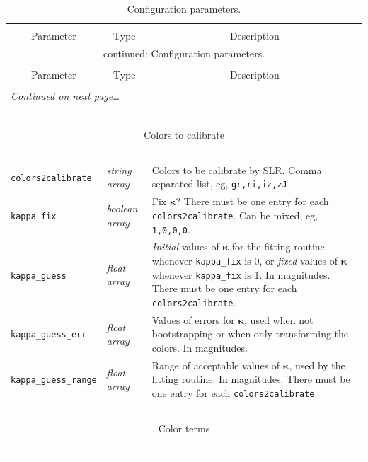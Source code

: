 \documentclass{report}
\newcommand{\zptcolor}{\boldsymbol{\kappa}}
\begin{document}
\begin{center}
\begin{longtable}{llp{3.5in}}
\caption[Configuration parameters.]{Configuration parameters.}
\label{tab:config} \\
  \hline \hline \\[-2ex]
  \multicolumn{1}{c}{Parameter} &
  \multicolumn{1}{c}{Type} &
  \multicolumn{1}{c}{Description} \\[0.5ex] \hline
\endfirsthead
\multicolumn{3}{c}{{\tablename} \thetable{} continued: Configuration parameters.} \\[0.5ex]
  \hline \hline \\[-2ex]
  \multicolumn{1}{c}{Parameter} &
  \multicolumn{1}{c}{Type} &
  \multicolumn{1}{c}{Description} 
\\[0.5ex] \hline
  \\[-1.8ex]
\endhead
\multicolumn{3}{l}{{{\it Continued on next page}\ldots}} \\
\endfoot
  \\[-1.8ex] \hline \hline
\endlastfoot

~ & ~ & ~ \\ \hline
\multicolumn{3}{c}{Colors to calibrate} \\
\hline ~ & ~ & ~ \\ 

\verb|colors2calibrate| & {\it string array} & Colors to be calibrate by SLR. Comma separated list, eg, \verb|gr,ri,iz,zJ| \\
\verb|kappa_fix| & {\it boolean array} & Fix $\zptcolor$? There must be one entry for each \verb|colors2calibrate|. Can be mixed, eg, \verb|1,0,0,0|. \\
\verb|kappa_guess| & {\it float array} & {\it Initial} values of $\zptcolor$ for the fitting routine whenever \verb|kappa_fix| is 0, or {\it fixed} values of $\mathbf{\kappa}$ whenever \verb|kappa_fix| is 1. In magnitudes. There must be one entry for each \verb|colors2calibrate|. \\
\verb|kappa_guess_err| & {\it float array} & Values of errors for $\zptcolor$, used when not bootstrapping or when only transforming the colors. In magnitudes. \\
\verb|kappa_guess_range| & {\it float array} & Range of acceptable values of $\zptcolor$, used by the fitting routine. In magnitudes. There must be one entry for each \verb|colors2calibrate|. \\

~ & ~ & ~ \\ \hline
\multicolumn{3}{c}{Color terms} \\
\hline ~ & ~ & ~ \\ 


\end{longtable}
\end{center}
\end{document}
